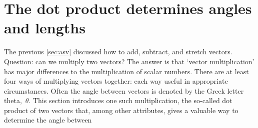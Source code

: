 
\section{The dot product determines angles and lengths}
\label{sec:dpdal}
\secttoc


The previous \cref{sec:asv} discussed how to add, subtract, and stretch vectors.
Question: can we multiply two vectors?
The answer is that `vector multiplication' has major differences to the multiplication of scalar numbers.
There are at least four ways of multiplying vectors together: each way useful in appropriate circumstances.
Often the angle between vectors is denoted by the Greek letter theta,~\(\theta\).
This section introduces one such multiplication, the so-called dot product of two vectors that, among other attributes, gives a valuable way to determine the angle between 


